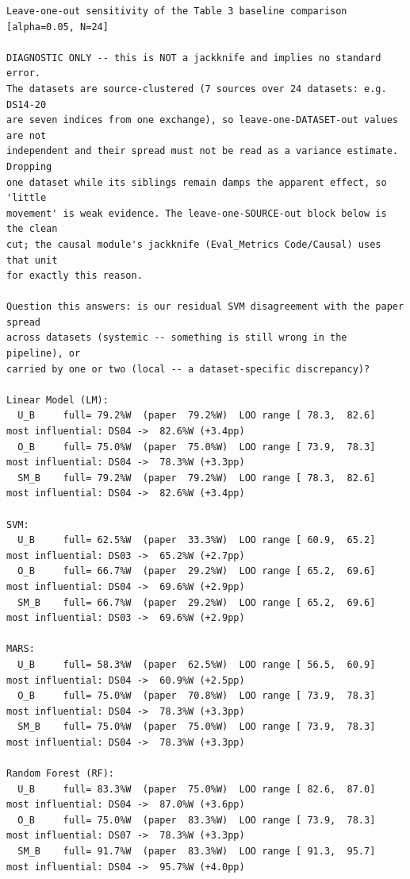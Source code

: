 \begingroup
{}
\label{tab:exp002_cmp_cmp_sensitivity}
\tiny
\begin{verbatim}
Leave-one-out sensitivity of the Table 3 baseline comparison  [alpha=0.05, N=24]

DIAGNOSTIC ONLY -- this is NOT a jackknife and implies no standard error.
The datasets are source-clustered (7 sources over 24 datasets: e.g. DS14-20
are seven indices from one exchange), so leave-one-DATASET-out values are not
independent and their spread must not be read as a variance estimate. Dropping
one dataset while its siblings remain damps the apparent effect, so 'little
movement' is weak evidence. The leave-one-SOURCE-out block below is the clean
cut; the causal module's jackknife (Eval_Metrics Code/Causal) uses that unit
for exactly this reason.

Question this answers: is our residual SVM disagreement with the paper spread
across datasets (systemic -- something is still wrong in the pipeline), or
carried by one or two (local -- a dataset-specific discrepancy)?

Linear Model (LM):
  U_B     full= 79.2%W  (paper  79.2%W)  LOO range [ 78.3,  82.6]  most influential: DS04 ->  82.6%W (+3.4pp)
  O_B     full= 75.0%W  (paper  75.0%W)  LOO range [ 73.9,  78.3]  most influential: DS04 ->  78.3%W (+3.3pp)
  SM_B    full= 79.2%W  (paper  79.2%W)  LOO range [ 78.3,  82.6]  most influential: DS04 ->  82.6%W (+3.4pp)

SVM:
  U_B     full= 62.5%W  (paper  33.3%W)  LOO range [ 60.9,  65.2]  most influential: DS03 ->  65.2%W (+2.7pp)
  O_B     full= 66.7%W  (paper  29.2%W)  LOO range [ 65.2,  69.6]  most influential: DS04 ->  69.6%W (+2.9pp)
  SM_B    full= 66.7%W  (paper  29.2%W)  LOO range [ 65.2,  69.6]  most influential: DS03 ->  69.6%W (+2.9pp)

MARS:
  U_B     full= 58.3%W  (paper  62.5%W)  LOO range [ 56.5,  60.9]  most influential: DS04 ->  60.9%W (+2.5pp)
  O_B     full= 75.0%W  (paper  70.8%W)  LOO range [ 73.9,  78.3]  most influential: DS04 ->  78.3%W (+3.3pp)
  SM_B    full= 75.0%W  (paper  75.0%W)  LOO range [ 73.9,  78.3]  most influential: DS04 ->  78.3%W (+3.3pp)

Random Forest (RF):
  U_B     full= 83.3%W  (paper  75.0%W)  LOO range [ 82.6,  87.0]  most influential: DS04 ->  87.0%W (+3.6pp)
  O_B     full= 75.0%W  (paper  83.3%W)  LOO range [ 73.9,  78.3]  most influential: DS07 ->  78.3%W (+3.3pp)
  SM_B    full= 91.7%W  (paper  83.3%W)  LOO range [ 91.3,  95.7]  most influential: DS04 ->  95.7%W (+4.0pp)


\end{verbatim}
